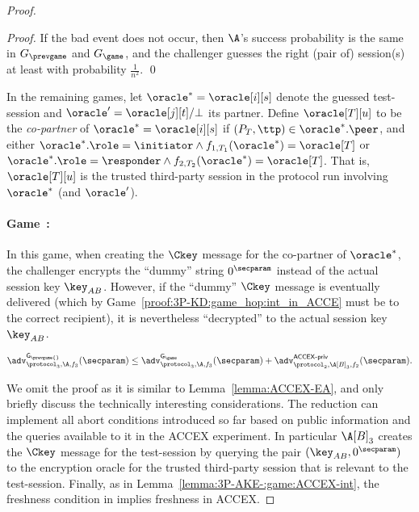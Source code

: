 \begin{proof}
\begin{proof}
If the bad event does not occur, then $\A$'s success probability is the same in $G_{\prevgame}$ and $G_{\game}$, and the challenger guesses the right (pair of) session(s) at least with probability $\frac{1}{n^2}$.
\qed
\end{proof}

In the remaining games,
let $\oracle^* = \oracle[i][s]$ denote the guessed test-session and $\oracle' = \oracle[j][t]/\bot$ its partner.
Define $\oracle[T][u]$ to be the \emph{co-partner} of $\oracle^* = \oracle[i][s]$
if $(P_T, \ttp) \in \oracle^*.\peer$,
and either $\oracle^*.\role = \initiator \wedge f_{1,T_1}(\oracle^*) = \oracle[T] $
or $\oracle^*.\role = \responder \wedge f_{2,T_2}(\oracle^*) = \oracle[T]$. 
That is, $\oracle[T][u]$ is the trusted third-party session in the protocol run involving~$\oracle^*$ (and $\oracle'$). 


\newgame
\paragraph{Game~\game:}\label{proof:3P-KD:game_hop:C_key_encrypt_0}
In this game, when creating the $\Ckey$ message for the co-partner of $\oracle^*$,
the challenger encrypts the ``dummy'' string $0^\secparam$
instead of the actual session key $\key_{AB}$.
However,
if the ``dummy'' $\Ckey$ message is eventually delivered 
(which by Game~\ref{proof:3P-KD:game_hop:int_in_ACCE} must be to the correct recipient),
it is nevertheless ``decrypted'' to the actual session key $\key_{AB}$.



\begin{lemma}\label{lemma:3P-KD:abort_on_forgery}
$
	\adv_{\protocol_3,\A,f_3}^{\mathsf{G_{\prevgame{}}}}(\secparam) 
	\leq \adv_{\protocol_3,\A,f_3}^{\mathsf{G_\game}}(\secparam) 
	+ \adv_{\protocol_2, \A[B]_3,f_2}^{\operatorname{\mathsf{ACCEX-priv}}}(\secparam)  .
$
\end{lemma}

We omit the proof as it is similar to Lemma~\ref{lemma:ACCEX-EA}, 
and only briefly discuss the technically interesting considerations. 
The reduction can implement all abort conditions introduced so far based on
public information and the queries available to it in the ACCEX experiment. 
In particular $\A[B]_3$ creates the $\Ckey$ message for the test-session by querying the pair $(\key_{AB}, 0^\secparam)$ to the encryption oracle for the trusted third-party session that is relevant to the test-session. 
Finally, as in Lemma~\ref{lemma:3P-AKE-:game:ACCEX-int}, the freshness condition in 
\AKEm{} implies freshness in ACCEX.


\end{proof}
